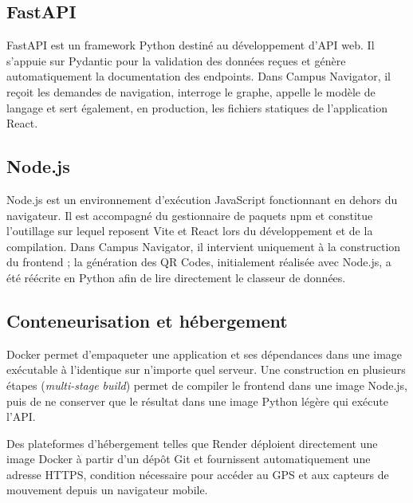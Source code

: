 \documentclass[12pt,a4paper]{report}
\begin{document}
\subsection{FastAPI}

FastAPI est un framework Python destiné au développement d'API web. Il s'appuie sur Pydantic pour
la validation des données reçues et génère automatiquement la documentation des endpoints. Dans
Campus Navigator, il reçoit les demandes de navigation, interroge le graphe, appelle le modèle de
langage et sert également, en production, les fichiers statiques de l'application React.

\subsection{Node.js}

Node.js est un environnement d'exécution JavaScript fonctionnant en dehors du navigateur. Il est
accompagné du gestionnaire de paquets npm et constitue l'outillage sur lequel reposent Vite et
React lors du développement et de la compilation. Dans Campus Navigator, il intervient uniquement
à la construction du frontend ; la génération des QR Codes, initialement réalisée avec Node.js, a
été réécrite en Python afin de lire directement le classeur de données.

\subsection{Conteneurisation et hébergement}

Docker permet d'empaqueter une application et ses dépendances dans une image exécutable à
l'identique sur n'importe quel serveur. Une construction en plusieurs étapes (\emph{multi-stage
build}) permet de compiler le frontend dans une image Node.js, puis de ne conserver que le résultat
dans une image Python légère qui exécute l'API.

Des plateformes d'hébergement telles que Render déploient directement une image Docker à partir
d'un dépôt Git et fournissent automatiquement une adresse HTTPS, condition nécessaire pour
accéder au GPS et aux capteurs de mouvement depuis un navigateur mobile.
\end{document}
